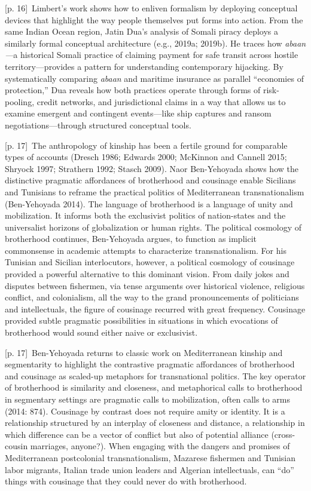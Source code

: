 \documentclass[10pt,a4paper]{article}
\begin{document}
{\scriptsize\color{gray} [p. 16]}\ Limbert’s work shows how to enliven formalism by deploying conceptual devices that highlight the way people themselves put forms into action. From the same Indian Ocean region, Jatin Dua’s analysis of Somali piracy deploys a similarly formal conceptual architecture (e.g., 2019a; 2019b). He traces how \textit{abaan} \textit{—}a historical Somali practice of claiming payment for safe transit across hostile territory—provides a pattern for understanding contemporary hijacking. By systematically comparing \textit{abaan} and maritime insurance as parallel “economies of protection,” Dua reveals how both practices operate through forms of risk-pooling, credit networks, and jurisdictional claims in a way that allows us to examine emergent and contingent events—like ship captures and ransom negotiations—through structured conceptual tools.\par
{\scriptsize\color{gray} [p. 17]}\ The anthropology of kinship has been a fertile ground for comparable types of accounts (Dresch 1986; Edwards 2000; McKinnon and Cannell 2015; Shryock 1997; Strathern 1992; Stasch 2009). Naor Ben-Yehoyada shows how the distinctive pragmatic affordances of brotherhood and cousinage enable Sicilians and Tunisians to reframe the practical politics of Mediterranean transnationalism (Ben-Yehoyada 2014). The language of brotherhood is a language of unity and mobilization. It informs both the exclusivist politics of nation-states and the universalist horizons of globalization or human rights. The political cosmology of brotherhood continues, Ben-Yehoyada argues, to function as implicit commonsense in academic attempts to characterize transnationalism. For his Tunisian and Sicilian interlocutors, however, a political cosmology of cousinage provided a powerful alternative to this dominant vision. From daily jokes and disputes between fishermen, via tense arguments over historical violence, religious conflict, and colonialism, all the way to the grand pronouncements of politicians and intellectuals, the figure of cousinage recurred with great frequency. Cousinage provided subtle pragmatic possibilities in situations in which evocations of brotherhood would sound either naive or exclusivist.\par
{\scriptsize\color{gray} [p. 17]}\ Ben-Yehoyada returns to classic work on Mediterranean kinship and segmentarity to highlight the contrastive pragmatic affordances of brotherhood and cousinage as scaled-up metaphors for transnational politics. The key operator of brotherhood is similarity and closeness, and metaphorical calls to brotherhood in segmentary settings are pragmatic calls to mobilization, often calls to arms (2014: 874). Cousinage by contrast does not require amity or identity. It is a relationship structured by an interplay of closeness and distance, a relationship in which difference can be a vector of conflict but also of potential alliance (cross-cousin marriages, anyone?). When engaging with the dangers and promises of Mediterranean postcolonial transnationalism, Mazarese fishermen and Tunisian labor migrants, Italian trade union leaders and Algerian intellectuals, can “do” things with cousinage that they could never do with brotherhood.\par
\end{document}
